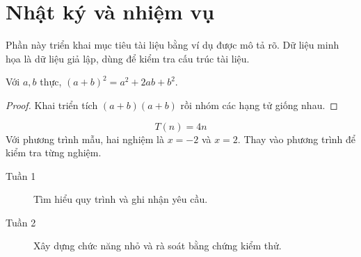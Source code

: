 \chapter{Nhật ký và nhiệm vụ}


\label{sec:chapter2}
Phần này triển khai mục tiêu tài liệu bằng ví dụ được mô tả rõ. Dữ liệu minh họa là dữ liệu giả lập, dùng để kiểm tra cấu trúc tài liệu.

\begin{demotheorem}
Với $a,b$ thực, $(a+b)^2=a^2+2ab+b^2$.
\end{demotheorem}
\begin{proof}
Khai triển tích $(a+b)(a+b)$ rồi nhóm các hạng tử giống nhau.
\end{proof}
\[T(n)=4n\]
Với phương trình mẫu, hai nghiệm là $x=-2$ và $x=2$. Thay vào phương trình để kiểm tra từng nghiệm.
\begin{description}
\item[Tuần 1] Tìm hiểu quy trình và ghi nhận yêu cầu.
\item[Tuần 2] Xây dựng chức năng nhỏ và rà soát bằng chứng kiểm thử.
\end{description}
